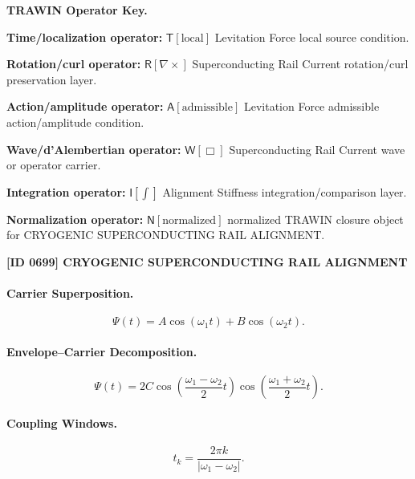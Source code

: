 \par\vspace{0.45\baselineskip}
\noindent\begin{minipage}[t]{\linewidth}
\begingroup
\small
\raggedright
\textbf{TRAWIN Operator Key.}\par
\noindent\textbf{Time/localization operator:} $\mathsf{T}\!\left[\mathrm{local}\right]$ Levitation Force local source condition.\par
\noindent\textbf{Rotation/curl operator:} $\mathsf{R}\!\left[\nabla\times\right]$ Superconducting Rail Current rotation/curl preservation layer.\par
\noindent\textbf{Action/amplitude operator:} $\mathsf{A}\!\left[\mathrm{admissible}\right]$ Levitation Force admissible action/amplitude condition.\par
\noindent\textbf{Wave/d'Alembertian operator:} $\mathsf{W}\!\left[\Box\right]$ Superconducting Rail Current wave or operator carrier.\par
\noindent\textbf{Integration operator:} $\mathsf{I}\!\left[\int\right]$ Alignment Stiffness integration/comparison layer.\par
\noindent\textbf{Normalization operator:} $\mathsf{N}\!\left[\mathrm{normalized}\right]$ normalized TRAWIN closure object for CRYOGENIC SUPERCONDUCTING RAIL ALIGNMENT.\par
\endgroup
\end{minipage}

\clearpage
\noindent\textbf{[ID 0699] CRYOGENIC SUPERCONDUCTING RAIL ALIGNMENT}\par
\vspace{0.35em}
\paragraph{Carrier Superposition.}
\begin{equation}
\Psi(t)=A\cos(\omega_1t)+B\cos(\omega_2t).
\end{equation}

\paragraph{Envelope--Carrier Decomposition.}
\begin{equation}
\Psi(t)
=
2C
\cos\left(
\frac{\omega_1-\omega_2}{2}t
\right)
\cos\left(
\frac{\omega_1+\omega_2}{2}t
\right).
\end{equation}

\paragraph{Coupling Windows.}
\begin{equation}
t_k=
\frac{2\pi k}{|\omega_1-\omega_2|}.
\end{equation}

